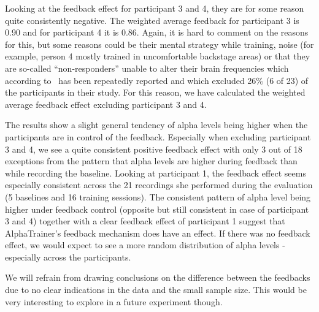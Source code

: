 \documentclass[a4paper,10pt,english,lof,lot,twoside]{puthesis}
\begin{document}
Looking at the feedback effect for participant 3 and 4, they are for some reason quite consistently negative. The weighted average feedback for participant 3 is 0.90 and for participant 4 it is 0.86. Again, it is hard to comment on the reasons for this, but some reasons could be their mental strategy while training, noise (for example, person 4 mostly trained in uncomfortable backstage areas) or that they are so-called ``non-responders'' unable to alter their brain frequencies which according to \cite{stopczynski_smartphones_2013} has been repeatedly reported and which excluded 26\% (6 of 23) of the participants in their study. For this reason, we have calculated the weighted average feedback effect excluding participant 3 and 4.

The results show a slight general tendency of alpha levels being higher when the participants are in control of the feedback. Especially when excluding participant 3 and 4, we see a quite consistent positive feedback effect with only 3 out of 18 exceptions from the pattern that alpha levels are higher during feedback than while recording the baseline. Looking at participant 1, the feedback effect seems especially consistent across the 21 recordings she performed during the evaluation (5 baselines and 16 training sessions). The consistent pattern of alpha level being higher under feedback control (opposite but still consistent in case of participant 3 and 4) together with a clear feedback effect of participant 1 suggest that AlphaTrainer's feedback mechanism does have an effect. If there was no feedback effect, we would expect to see a more random distribution of alpha levels - especially across the participants.

We will refrain from drawing conclusions on the difference between the feedbacks due to no clear indications in the data and the small sample size. This would be very interesting to explore in a future experiment though.
\end{document}
